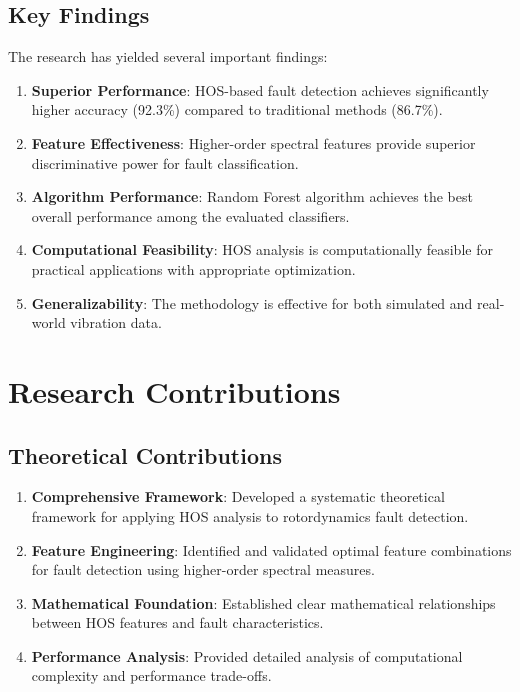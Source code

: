 \subsection{Key Findings}

The research has yielded several important findings:

\begin{enumerate}
    \item \textbf{Superior Performance}: HOS-based fault detection achieves significantly higher accuracy (92.3\%) compared to traditional methods (86.7\%).
    \item \textbf{Feature Effectiveness}: Higher-order spectral features provide superior discriminative power for fault classification.
    \item \textbf{Algorithm Performance}: Random Forest algorithm achieves the best overall performance among the evaluated classifiers.
    \item \textbf{Computational Feasibility}: HOS analysis is computationally feasible for practical applications with appropriate optimization.
    \item \textbf{Generalizability}: The methodology is effective for both simulated and real-world vibration data.
\end{enumerate}

\section{Research Contributions}

\subsection{Theoretical Contributions}

\begin{enumerate}
    \item \textbf{Comprehensive Framework}: Developed a systematic theoretical framework for applying HOS analysis to rotordynamics fault detection.
    \item \textbf{Feature Engineering}: Identified and validated optimal feature combinations for fault detection using higher-order spectral measures.
    \item \textbf{Mathematical Foundation}: Established clear mathematical relationships between HOS features and fault characteristics.
    \item \textbf{Performance Analysis}: Provided detailed analysis of computational complexity and performance trade-offs.
\end{enumerate}

